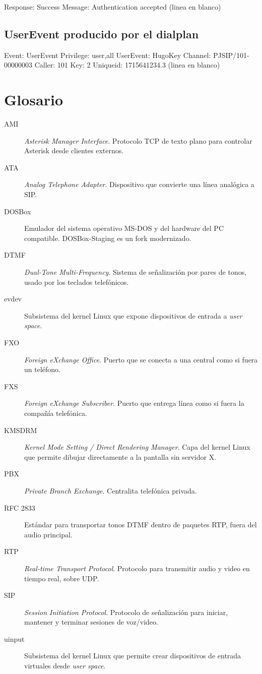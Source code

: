 \begin{plaincode}
Response: Success
Message: Authentication accepted
(linea en blanco)
\end{plaincode}

\subsection{UserEvent producido por el dialplan}

\begin{plaincode}
Event: UserEvent
Privilege: user,all
UserEvent: HugoKey
Channel: PJSIP/101-00000003
Caller: 101
Key: 2
Uniqueid: 1715641234.3
(linea en blanco)
\end{plaincode}

\section{Glosario}

\begin{description}
  \item[AMI] \emph{Asterisk Manager Interface}. Protocolo TCP de texto plano para controlar Asterisk desde clientes externos.
  \item[ATA] \emph{Analog Telephone Adapter}. Dispositivo que convierte una línea analógica a SIP.
  \item[DOSBox] Emulador del sistema operativo MS-DOS y del hardware del PC compatible. DOSBox-Staging es un fork modernizado.
  \item[DTMF] \emph{Dual-Tone Multi-Frequency}. Sistema de señalización por pares de tonos, usado por los teclados telefónicos.
  \item[evdev] Subsistema del kernel Linux que expone dispositivos de entrada a \emph{user space}.
  \item[FXO] \emph{Foreign eXchange Office}. Puerto que se conecta a una central como si fuera un teléfono.
  \item[FXS] \emph{Foreign eXchange Subscriber}. Puerto que entrega línea como si fuera la compañía telefónica.
  \item[KMSDRM] \emph{Kernel Mode Setting / Direct Rendering Manager}. Capa del kernel Linux que permite dibujar directamente a la pantalla sin servidor X.
  \item[PBX] \emph{Private Branch Exchange}. Centralita telefónica privada.
  \item[RFC 2833] Estándar para transportar tonos DTMF dentro de paquetes RTP, fuera del audio principal.
  \item[RTP] \emph{Real-time Transport Protocol}. Protocolo para transmitir audio y video en tiempo real, sobre UDP.
  \item[SIP] \emph{Session Initiation Protocol}. Protocolo de señalización para iniciar, mantener y terminar sesiones de voz/video.
  \item[uinput] Subsistema del kernel Linux que permite crear dispositivos de entrada virtuales desde \emph{user space}.
\end{description}

